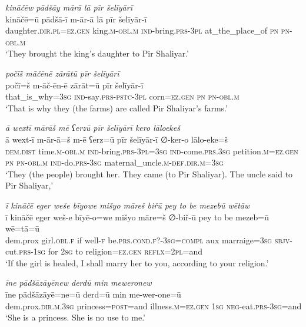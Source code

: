 \ea \label{ZP.93}
\textit{kināčēw pādšāy mārā lā pīr šelīyārī} \\ 
\gll kināčē=ū pādšā-ī m-ār-ā lā pīr šelīyār-ī \\ 
 daughter\textsc{.dir}\textsc{.pl}\textsc{\textsc{=ez.gen}} king\textsc{.m}\textsc{-obl}\textsc{.m} \textsc{ind-}bring\textsc{.prs}\textsc{-3pl} at\_the\_place\_of \textsc{pn} \textsc{pn}\textsc{-obl}\textsc{.m} \\ 
\glt `They brought the king’s daughter to Pir Shaliyar.'
\z 
 
\ea \label{ZP.96}
\textit{počīš māčēnē zārātū pīr šelīyārī} \\ 
\gll počī=š m-āč-ēn-ē zārāt=ū pīr šelīyār-ī \\ 
 that\_is\_why\textsc{=3sg} \textsc{ind-}say\textsc{.prs}\textsc{-pstc}\textsc{-3pl} corn\textsc{\textsc{=ez.gen}} \textsc{pn} \textsc{pn}\textsc{-obl}\textsc{.m} \\ 
\glt `That is why they (the farms) are called Pir Shaliyar’s farms.'
\z 
 
\ea \label{ZP.97}
\textit{ā wextī mārāš mē ʕerzū pīr šelīyārī kero lāloekeš} \\ 
\gll ā wext-ī m-ār-ā=š m-ē ʕerz=ū pīr šelīyār-ī ∅-ker-o lālo-eke=š \\ 
 \textsc{dem.dist} time\textsc{.m}\textsc{-obl}\textsc{.m} \textsc{ind-}bring\textsc{.prs}\textsc{-3pl}\textsc{=3sg} \textsc{ind-}come\textsc{.prs}\textsc{.3sg} petition\textsc{.m}\textsc{\textsc{=ez.gen}} \textsc{pn} \textsc{pn}\textsc{-obl}\textsc{.m} \textsc{ind-}do\textsc{.prs}\textsc{-3sg} maternal\_uncle\textsc{.m}\textsc{-def}\textsc{.dir}\textsc{.m}\textsc{=3sg} \\ 
\glt `They (the people) brought her. They came (to Pir Shaliyar). The uncle said to Pir Shaliyar,'
\z 
 
\ea \label{ZP.100}
\textit{ī kināčē eger weše bīyowe mišyo māreš biřū pey to be mezebū wētāw} \\ 
\gll ī kināčē eger weš-e bīyē-o=we mišyo māre=š ∅-biř-ū pey to be mezeb=ū wē=tā=ū \\ 
 dem.prox girl\textsc{.obl}\textsc{.f} if well\textsc{-f} be\textsc{.prs}.\textsc{cond}\textsc{.f}?\textsc{-3sg}\textsc{=compl} aux marraige\textsc{=3sg} \textsc{sbjv-}cut\textsc{.prs}\textsc{-\textsc{1sg}} for \textsc{2sg} to religion\textsc{\textsc{=ez.gen}} \textsc{reflx}=\textsc{2pl}=and \\ 
\glt `If the girl is healed, I shall marry her to you, according to your religion.'
\z 
 
\ea \label{ZP.102}
\textit{īne pādšāzāyēnew derdū min meweronew} \\ 
\gll īne pādšāzāyē=ne=ū derd=ū min me-wer-one=ū \\ 
 dem.prox\textsc{.dir}\textsc{.m}\textsc{.3sg} princess\textsc{=\textsc{post}}=and illness\textsc{.m}\textsc{\textsc{=ez.gen}} \textsc{1sg} \textsc{neg-}eat\textsc{.prs}\textsc{-3sg}=and \\ 
\glt `She is a princess. She is no use to me.'
\z 
 
